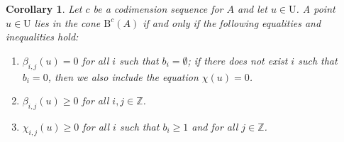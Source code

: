 \documentclass[12pt]{amsart}
\newtheorem{cor}[lemma]{Corollary}
\theoremstyle{definition}
\theoremstyle{remark}
\newcommand{\ZZ}{\mathbb{Z}}
\newcommand{\UU}{\mathrm{U}}
\newcommand{\cc}{c}
\newcommand{\nothing}{\emptyset}
\newcommand{\BBQ}{\mathrm{B}}
\begin{document}
\begin{cor}\label{cor:dualconeA refined}
Let $\cc$ be a codimension sequence for $A$ and let $u\in \UU$.
A point $u\in \UU$ lies in the cone $\BBQ^{\cc}(A)$ if and only if the following equalities and inequalities hold:
\begin{enumerate}
	\item $\beta_{i,j}(u)=0$ for all $i$ such that $b_i=\nothing$; if there does not exist $i$ such that $b_i=0$, then we also include the equation $\chi(u)=0$.
	\item $\beta_{i,j}(u)\geq 0$ for all $i,j\in \ZZ$.
	\item  $\chi_{i,j}(u)\geq 0$ for all $i$ such that $b_i\geq 1$ and for all $j\in \ZZ$.
\end{enumerate}
\end{cor}
\end{document}
